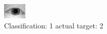 \begin{figure}[h!]
\begin{center}
\includegraphics[width=0.60\columnwidth]{figures/ID992_class_1_target_2.png}
\end{center}
\caption{ Classification: 1 actual target: 2}
\label{fig:ID992_class_1_target_2}
\end{figure}
